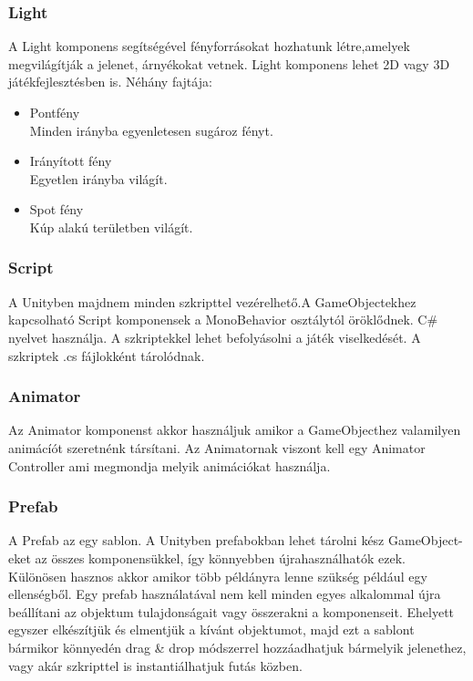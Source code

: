 \documentclass[
]{thesis-ekf}
\theoremstyle{definition}
\theoremstyle{remark}
\begin{document}
\subsubsection{Light}
A Light komponens segítségével fényforrásokat hozhatunk létre,amelyek megvilágítják a jelenet, árnyékokat vetnek. Light komponens lehet 2D vagy 3D játékfejlesztésben is.\cite{UnityLight} Néhány fajtája:
\begin{itemize}
	\item Pontfény \\ Minden irányba egyenletesen sugároz fényt.
	\item Irányított fény \\ Egyetlen irányba világít.
	\item Spot fény \\ Kúp alakú területben világít.
\end{itemize}
\subsubsection{Script}
A Unityben majdnem minden szkripttel vezérelhető.A GameObjectekhez kapcsolható Script komponensek a MonoBehavior osztálytól öröklődnek. C\# nyelvet használja. A szkriptekkel lehet befolyásolni a játék viselkedését. A szkriptek .cs fájlokként tárolódnak.\cite{UnityScript}

\subsubsection{Animator}
Az Animator komponenst akkor használjuk amikor a GameObjecthez valamilyen animácíót szeretnénk társítani. Az Animatornak viszont kell egy Animator Controller ami megmondja melyik animációkat használja.\cite{UnityAnimatorComponent}

\subsubsection{Prefab}
A Prefab az egy sablon. A Unityben prefabokban lehet tárolni kész GameObject-eket az összes komponensükkel, így könnyebben újrahasználhatók ezek. Különösen hasznos akkor amikor több példányra lenne szükség például egy ellenségből. Egy prefab használatával nem kell minden egyes alkalommal újra beállítani az objektum tulajdonságait vagy összerakni a komponenseit. Ehelyett egyszer elkészítjük és elmentjük a kívánt objektumot, majd ezt a sablont bármikor könnyedén drag \& drop módszerrel hozzáadhatjuk bármelyik jelenethez, vagy akár szkripttel is instantiálhatjuk futás közben. \cite{UnityPrefabs}
\end{document}
